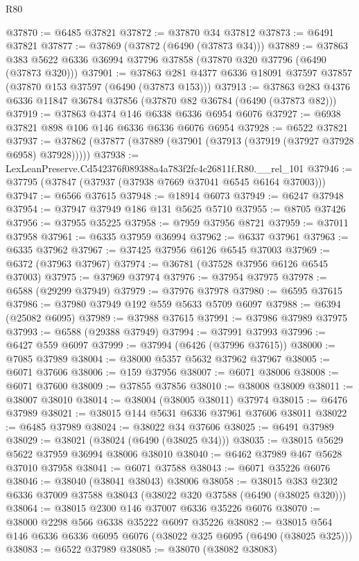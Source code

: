 \begin{lexlean}{R80}
\begin{coremodule}
@37870 := @6485 @37821
@37872 := @37870 @34 @37812
@37873 := @6491 @37821
@37877 := @37869 (@37872 (@6490 (@37873 @34)))
@37889 := @37863 @383 @5622 @6336 @36994 @37796 @37858 (@37870 @320 @37796 (@6490 (@37873 @320)))
@37901 := @37863 @281 @4377 @6336 @18091 @37597 @37857 (@37870 @153 @37597 (@6490 (@37873 @153)))
@37913 := @37863 @283 @4376 @6336 @11847 @36784 @37856 (@37870 @82 @36784 (@6490 (@37873 @82)))
@37919 := @37863 @4374 @146 @6338 @6336 @6954 @6076
@37927 := @6938 @37821 @898 @106 @146 @6336 @6336 @6076 @6954
@37928 := @6522 @37821
@37937 := @37862 (@37877 (@37889 (@37901 (@37913 (@37919 (@37927 @37928 @6958) @37928)))))
@37938 := LexLeanPreserve.Cd542376f089388a4a783f2fc4c26811f.R80.__rel_101
@37946 := @37795 (@37847 (@37937 (@37938 @7669 @37041 @6545 @6164 @37003)))
@37947 := @6566 @37615
@37948 := @18914 @6073
@37949 := @6247 @37948
@37954 := @37947 @37949 @186 @131 @5625 @5710
@37955 := @8705 @37426
@37956 := @37955 @35225
@37958 := @7959 @37956 @8721
@37959 := @37011 @37958
@37961 := @6335 @37959 @36994
@37962 := @6337 @37961
@37963 := @6335 @37962
@37967 := @37425 @37956 @6126 @6545 @37003
@37969 := @6372 (@37963 @37967)
@37974 := @36781 (@37528 @37956 @6126 @6545 @37003)
@37975 := @37969 @37974
@37976 := @37954 @37975
@37978 := @6588 (@29299 @37949)
@37979 := @37976 @37978
@37980 := @6595 @37615
@37986 := @37980 @37949 @192 @559 @5633 @5709 @6097
@37988 := @6394 (@25082 @6095)
@37989 := @37988 @37615
@37991 := @37986 @37989 @37975
@37993 := @6588 (@29388 @37949)
@37994 := @37991 @37993
@37996 := @6427 @559 @6097
@37999 := @37994 (@6426 (@37996 @37615))
@38000 := @7085 @37989
@38004 := @38000 @5357 @5632 @37962 @37967
@38005 := @6071 @37606
@38006 := @159 @37956
@38007 := @6071 @38006
@38008 := @6071 @37600
@38009 := @37855 @37856
@38010 := @38008 @38009
@38011 := @38007 @38010
@38014 := @38004 (@38005 @38011) @37974
@38015 := @6476 @37989
@38021 := @38015 @144 @5631 @6336 @37961 @37606 @38011
@38022 := @6485 @37989
@38024 := @38022 @34 @37606
@38025 := @6491 @37989
@38029 := @38021 (@38024 (@6490 (@38025 @34)))
@38035 := @38015 @5629 @5622 @37959 @36994 @38006 @38010
@38040 := @6462 @37989 @467 @5628 @37010 @37958
@38041 := @6071 @37588
@38043 := @6071 @35226 @6076
@38046 := @38040 (@38041 @38043) @38006
@38058 := @38015 @383 @2302 @6336 @37009 @37588 @38043 (@38022 @320 @37588 (@6490 (@38025 @320)))
@38064 := @38015 @2300 @146 @37007 @6336 @35226 @6076
@38070 := @38000 @2298 @566 @6338 @35222 @6097 @35226
@38082 := @38015 @564 @146 @6336 @6336 @6095 @6076 (@38022 @325 @6095 (@6490 (@38025 @325)))
@38083 := @6522 @37989
@38085 := @38070 (@38082 @38083)

\end{coremodule}
\end{lexlean}
